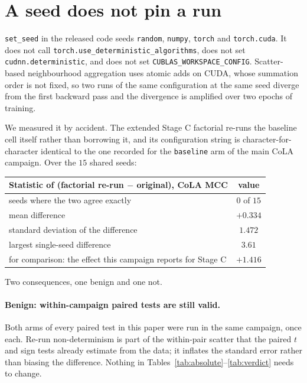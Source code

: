 \documentclass{article}
\begin{document}
\section{A seed does not pin a run}
\label{app:determinism}

\texttt{set\_seed} in the released code seeds \texttt{random}, \texttt{numpy},
\texttt{torch} and \texttt{torch.cuda}. It does not call
\texttt{torch.use\_deterministic\_algorithms}, does not set
\texttt{cudnn.deterministic}, and does not set
\texttt{CUBLAS\_WORKSPACE\_CONFIG}. Scatter-based neighbourhood aggregation uses
atomic adds on CUDA, whose summation order is not fixed, so two runs of the same
configuration at the same seed diverge from the first backward pass and the
divergence is amplified over two epochs of training.

We measured it by accident. The extended Stage C factorial re-runs the baseline
cell itself rather than borrowing it, and its configuration string is
character-for-character identical to the one recorded for the \texttt{baseline}
arm of the main CoLA campaign. Over the $15$ shared seeds:

\begin{center}
\small
\begin{tabular}{lc}
\toprule
Statistic of (factorial re-run $-$ original), CoLA MCC & value \\
\midrule
seeds where the two agree exactly & $0$ of $15$ \\
mean difference & $+0.334$ \\
standard deviation of the difference & $1.472$ \\
largest single-seed difference & $3.61$ \\
\midrule
for comparison: the effect this campaign reports for Stage C & $+1.416$ \\
\bottomrule
\end{tabular}
\end{center}

Two consequences, one benign and one not.

\paragraph{Benign: within-campaign paired tests are still valid.} Both arms of
every paired test in this paper were run in the same campaign, once each. Re-run
non-determinism is part of the within-pair scatter that the paired $t$ and sign
tests already estimate from the data; it inflates the standard error rather than
biasing the difference. Nothing in
Tables~\ref{tab:absolute}--\ref{tab:verdict} needs to change.
\end{document}

